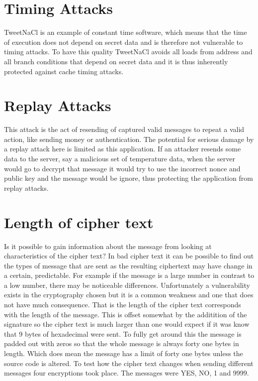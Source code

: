 \section{Timing Attacks}

TweetNaCl is an example of constant time software, which means that the time of execution does not depend on secret data and is therefore not vulnerable to timing attacks. To have this quality TweetNaCl avoids all loads from address and all branch conditions that depend on secret data and it is thus inherently protected against cache timing attacks. 

\section{Replay Attacks}

This attack is the act of resending of captured valid messages to repeat a valid action, like sending money or authentication. The potential for serious damage by a replay attack here is limited as this application. If an attacker resends some data to the server, say a malicious set of temperature data, when the server would go to decrypt that message it would try to use the incorrect nonce and public key and the message would be ignore, thus protecting the application from replay attacks.

\section{Length of cipher text}

Is it possible to gain information about the message from looking at characteristics of the cipher text? In bad cipher text it can be possible to find out the types of message that are sent as the resulting ciphertext may have change in a certain, predictable. For example if the message is a large number in contrast to a low number, there may be noticeable differences. Unfortunately a vulnerability exists in the cryptography chosen but it is a common weakness and one that does not have much consequence. That is the length of the cipher text corresponds with the length of the message. This is offset somewhat by the additition of the signature so the cipher text is much larger than one would expect if it was know that 9 bytes of hexadecimal were sent. To fully get around this the message is padded out with zeros so that the whole message is always forty one bytes in length. Which does mean the message has a limit of forty one bytes unless the source code is altered. To test how the cipher text changes when sending different messages four encryptions took place. The messages were YES, NO, 1 and 9999. 


